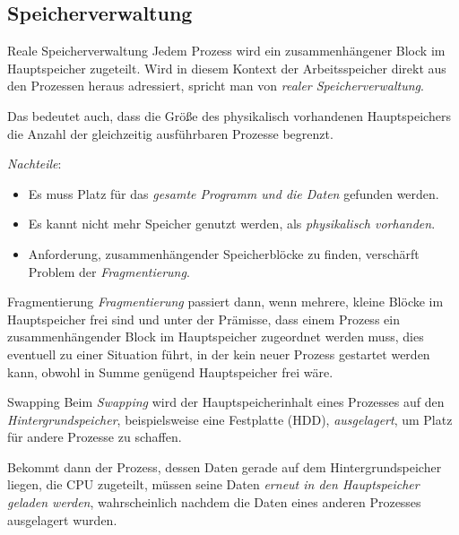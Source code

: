 \subsection{Speicherverwaltung}

\begin{defi}{Reale Speicherverwaltung}
    Jedem Prozess wird ein zusammenhängener Block im Hauptspeicher zugeteilt.
    Wird in diesem Kontext der Arbeitsspeicher direkt aus den Prozessen heraus adressiert, spricht man von \emph{realer Speicherverwaltung}.

    Das bedeutet auch, dass die Größe des physikalisch vorhandenen Hauptspeichers die Anzahl der gleichzeitig ausführbaren Prozesse begrenzt.

    \emph{Nachteile}:
    \begin{itemize}
        \item Es muss Platz für das \emph{gesamte Programm und die Daten} gefunden werden.
        \item Es kannt nicht mehr Speicher genutzt werden, als \emph{physikalisch vorhanden}.
        \item Anforderung, zusammenhängender Speicherblöcke zu finden, verschärft Problem der \emph{Fragmentierung}.
    \end{itemize}
\end{defi}

\begin{bonus}{Fragmentierung}
    \emph{Fragmentierung} passiert dann, wenn mehrere, kleine Blöcke im Hauptspeicher frei sind und unter der Prämisse, dass einem
    Prozess ein zusammenhängender Block im Hauptspeicher zugeordnet werden
    muss, dies eventuell zu einer Situation führt, in der kein neuer Prozess gestartet
    werden kann, obwohl in Summe genügend Hauptspeicher frei wäre.
\end{bonus}

\begin{defi}{Swapping}
    Beim \emph{Swapping} wird der
    Hauptspeicherinhalt eines Prozesses auf den \emph{Hintergrundspeicher}, beispielsweise
    eine Festplatte (HDD), \emph{ausgelagert}, um Platz für andere Prozesse zu schaffen.

    Bekommt dann der Prozess, dessen Daten gerade auf dem Hintergrundspeicher liegen,
    die CPU zugeteilt, müssen seine Daten \emph{erneut in den Hauptspeicher geladen werden},
    wahrscheinlich nachdem die Daten eines anderen Prozesses ausgelagert wurden.
\end{defi}

